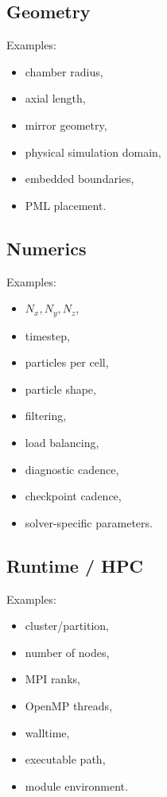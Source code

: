 \documentclass[11pt,a4paper]{article}
\begin{document}
\subsection{Geometry}

Examples:

\begin{itemize}
    \item chamber radius,
    \item axial length,
    \item mirror geometry,
    \item physical simulation domain,
    \item embedded boundaries,
    \item PML placement.
\end{itemize}

\subsection{Numerics}

Examples:

\begin{itemize}
    \item \(N_x,N_y,N_z\),
    \item timestep,
    \item particles per cell,
    \item particle shape,
    \item filtering,
    \item load balancing,
    \item diagnostic cadence,
    \item checkpoint cadence,
    \item solver-specific parameters.
\end{itemize}

\subsection{Runtime / HPC}

Examples:

\begin{itemize}
    \item cluster/partition,
    \item number of nodes,
    \item MPI ranks,
    \item OpenMP threads,
    \item walltime,
    \item executable path,
    \item module environment.
\end{itemize}
\end{document}
